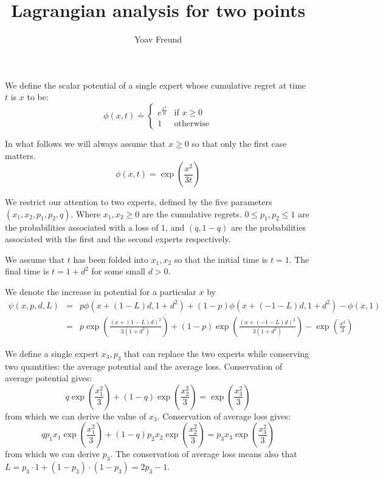 \documentclass{article}[12pt]
\title{Lagrangian analysis for two points}
\author{Yoav Freund}
\theoremstyle{plain}
\begin{document}
\maketitle

\newcommand{\paren}[1]{\left( #1 \right)}
\newcommand{\pot}[2]{\phi\left( #1,#2 \right)}
\newcommand{\potExpr}[2]{\exp\left( \frac{#1^2}{3 #2}\right)}
\newcommand{\dT}[1]{D(#1)}
\newcommand{\dR}[1]{R(#1)}
\newcommand{\dA}[1]{A(#1)}
\newcommand{\dB}[1]{B(#1)}
\newcommand{\thirdCol}[2]{#2 \left(1+ \frac{2}{3} #1^2\right) \potExpr{#1}{}}
\newcommand{\thirdColSimp}[2]{#2 \paren{\frac{1}{#1}+ \frac{2}{3} #1}\potExpr{#1}{}}

We define the scalar potential of a single expert whose cumulative
regret at time $t$ is $x$ to be:
\[
\pot{x}{t} \doteq 
\begin{cases} 
e^{\frac{x^2}{3t}} &\mbox{if } x \geq 0 \\
1 & \mbox{otherwise}
\end{cases} 
\]

In what follows we will always assume that $x\geq 0$ so that only the
first case matters.
\[
\pot{x}{t} = \potExpr{x}{t}
\]

We restrict our attention to two experts, defined by the five parameters
$(x_1,x_2,p_1,p_2,q)$. Where $x_1,x_2 \geq 0$ are the cumulative
regrets. $0 \leq p_1,p_2 \leq 1$ are the probabilities associated with
a loss of $1$, and $(q,1-q)$ are the probabilities associated with the
first and the second experts respectively.

We assume that $t$ has been folded into $x_1,x_2$ so that the initial
time is $t=1$. The final time is $t=1+d^2$ for some small $d>0$.
\newcommand{\changeExpr}[5]{#2 \potExpr{\paren{#1 #4 #3}}{\paren{1+#3^2}}+(1-#2) \potExpr{\paren{#1 #5 #3}}{\paren{1+#3^2}}-\potExpr{#1}{} }

We denote the increase in potential for a particular $x$ by 
\begin{eqnarray*}
\psi(x,p,d,L)&=&
p \pot{x+(1-L)d}{1+d^2}
+(1-p) \pot{x+(-1-L)d}{1+d^2}
-\pot{x}{1} \\
&=&
\changeExpr{x}{p}{d}{+(1-L)}{+(-1-L)}
\end{eqnarray*}

We define a single expert $x_3,p_3$ that can replace the two experts
while conserving two quantities: the average potential and the average
loss. Conservation of average potential gives:
\begin{equation}
q\potExpr{x_1}{}+(1-q)\potExpr{x_2}{} = \potExpr{x_3}{} \label{eqn:C1}
\end{equation}
from which we can derive the value of $x_3$. Conservation of average
loss gives:
\begin{equation}
q p_1 x_1 \potExpr{x_1}{}+(1-q) p_2 x_2 \potExpr{x_2}{} = p_3 x_3 \potExpr{x_3}{}
\label{eqn:C2}
\end{equation}
from which we can derive $p_3$. The conservation of average loss means
also that $L=p_3\cdot 1 + (1-p_3) \cdot (1-p_3) = 2p_3-1$.
\end{document}
